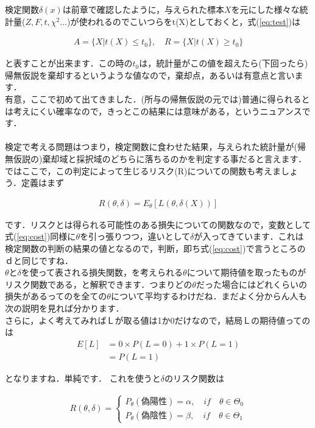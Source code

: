 \documentclass[11pt,a4paper,uplatex]{ujreport} 	%
\begin{document}
検定関数$\delta(x)$は前章で確認したように，与えられた標本$X$を元にした様々な統計量($Z,F,t,\chi^2...$)が使われるのでこいつらをt(X)としておくと，式(\ref{eq:test})は

\begin{align}
  A = \{X|t(X) \leq t_0\}, \quad R = \{X|t(X) \geq t_0\}
\end{align}

と表すことが出来ます．この時の$t_0$は，統計量がこの値を超えたら(下回ったら)帰無仮説を棄却するというような値なので，棄却点，あるいは有意点と言います．\\

有意，ここで初めて出てきました．(所与の帰無仮説の元では)普通に得られるとは考えにくい確率なので，きっとこの結果には意味がある，というニュアンスです．\\
\\

検定で考える問題はつまり，検定関数に食わせた結果，与えられた統計量が(帰無仮説の)棄却域と採択域のどちらに落ちるのかを判定する事だると言えます．\\

ではここで，この判定によって生じるリスク(R)についての関数も考えましょう．定義はまず

\begin{align}
  R(\theta, \delta) = E_\theta[L(\theta, \delta(X))]
\end{align}

です．リスクとは得られる可能性のある損失についての関数なので，変数として式(\ref{eq:cost})同様に$\theta$を引っ張りつつ，違いとして$\delta$が入ってきています．これは検定関数の判断の結果の値となるので，判断，即ち式(\ref{eq:cost})で言うところのｄと同じですね．\\

$\theta$と$\delta$を使って表される損失関数，を考えられる$\theta$について期待値を取ったものがリスク関数である，と解釈できます．つまりどの$\theta$だった場合にはどれくらいの損失があるってのを全ての$\theta$について平均するわけだね．まだよく分からん人も次の説明を見れば分かります．\\

さらに，よく考えてみればＬが取る値は1か0だけなので，結局Ｌの期待値ってのは
\begin{align}
  E[L] &= 0 \times P(L=0) + 1 \times P(L=1)\\
       &= P(L=1)
\end{align}

となりますね．単純です．
これを使うと$\delta$のリスク関数は

\begin{align}
  R(\theta, \delta) = 
  \left\{
    \begin{array}{l}
    P_\theta(偽陽性)=\alpha, \quad if \quad \theta \in \Theta_0\\
    P_\theta(偽陰性)=\beta, \quad if \quad \theta \in \Theta_1
    \end{array}
  \right.
  \label{eq:risk}
\end{align}
\end{document}
